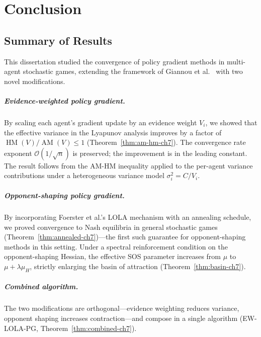 \chapter{Conclusion}
\label{ch:conclusion}

\section{Summary of Results}

This dissertation studied the convergence of policy gradient methods in multi-agent stochastic games, extending the framework of Giannou et al.~\cite{giannou2022} with two novel modifications.

\paragraph{Evidence-weighted policy gradient.} By scaling each agent's gradient update by an evidence weight $V_i$, we showed that the effective variance in the Lyapunov analysis improves by a factor of $\operatorname{HM}(V)/\operatorname{AM}(V) \leq 1$ (Theorem~\ref{thm:am-hm-ch7}). The convergence rate exponent $\mathcal{O}(1/\sqrt{n})$ is preserved; the improvement is in the leading constant. The result follows from the AM-HM inequality applied to the per-agent variance contributions under a heterogeneous variance model $\sigma_i^2 = C/V_i$.

\paragraph{Opponent-shaping policy gradient.} By incorporating Foerster et al.'s LOLA mechanism with an annealing schedule, we proved convergence to Nash equilibria in general stochastic games (Theorem~\ref{thm:annealed-ch7})---the first such guarantee for opponent-shaping methods in this setting. Under a spectral reinforcement condition on the opponent-shaping Hessian, the effective SOS parameter increases from $\mu$ to $\mu + \lambda\mu_H$, strictly enlarging the basin of attraction (Theorem~\ref{thm:basin-ch7}).

\paragraph{Combined algorithm.} The two modifications are orthogonal---evidence weighting reduces variance, opponent shaping increases contraction---and compose in a single algorithm (EW-LOLA-PG, Theorem~\ref{thm:combined-ch7}).

